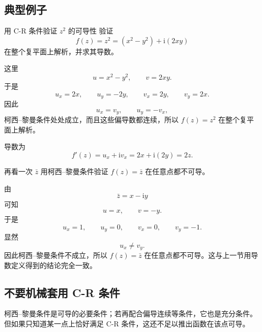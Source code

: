 \subsection{典型例子}

\begin{lizi}{用 C-R 条件验证 $z^2$ 的可导性}{}
验证
\[
    f(z)=z^2=(x^2-y^2)+\mathrm{i}(2xy)
\]
在整个复平面上解析，并求其导数。

\begin{jie}
这里
\[
    u=x^2-y^2,\qquad v=2xy.
\]
于是
\[
    u_x=2x,\qquad u_y=-2y,\qquad v_x=2y,\qquad v_y=2x.
\]
因此
\[
    u_x=v_y,\qquad u_y=-v_x,
\]
柯西--黎曼条件处处成立，而且这些偏导数都连续，所以 $f(z)=z^2$ 在整个复平面上解析。

导数为
\[
    f'(z)=u_x+\mathrm{i}v_x=2x+\mathrm{i}(2y)=2z.
\]
\end{jie}
\end{lizi}

\begin{lizi}{再看一次 $\bar z$}{}
用柯西--黎曼条件验证 $f(z)=\bar z$ 在任意点都不可导。

\begin{jie}
由
\[
    \bar z=x-\mathrm{i}y
\]
可知
\[
    u=x,\qquad v=-y.
\]
于是
\[
    u_x=1,\qquad u_y=0,\qquad v_x=0,\qquad v_y=-1.
\]
显然
\[
    u_x\neq v_y.
\]
因此柯西--黎曼条件不成立，所以 $f(z)=\bar z$ 在任意点都不可导。这与上一节用导数定义得到的结论完全一致。
\end{jie}
\end{lizi}

\subsection{不要机械套用 C-R 条件}

\begin{jinshi}[满足 C-R 条件不一定就可导]
柯西--黎曼条件是可导的必要条件；若再配合偏导连续等条件，它也是充分条件。但如果只知道某一点上恰好满足 C-R 条件，这还不足以推出函数在该点可导。
\end{jinshi}

